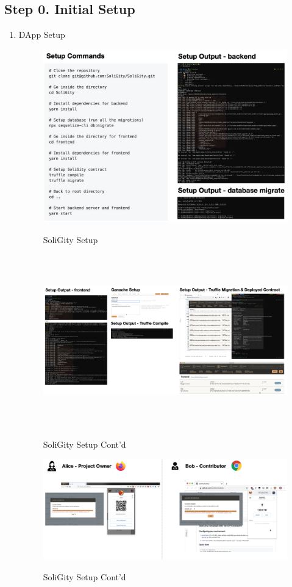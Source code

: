 \documentclass[12pt]{article}
\renewcommand{\_}{\kern-1.5pt\textunderscore\kern-1.5pt}
\begin{document}
\subsection*{Step 0. Initial Setup}
\begin{enumerate}
	\item DApp Setup
	      \begin{figure}[H]
		      \centering
		      \includegraphics[height=7.5cm]{graphs/46. setup_1.png}\\
		      \caption{SoliGity Setup}
		      \label{fig:setup1}
	      \end{figure}

	      \begin{figure}[H]
		      \centering
		      \includegraphics[height=7.5cm]{graphs/47. setup_2.png}\\
		      \caption{SoliGity Setup Cont'd}
		      \label{fig:setup2}
	      \end{figure}

	      \begin{figure}[H]
		      \centering
		      \includegraphics[width=16.5cm]{graphs/48. setup_3.png}\\
		      \caption{SoliGity Setup Cont'd}
		      \label{fig:setup3}
	      \end{figure}


\end{enumerate}
\end{document}
